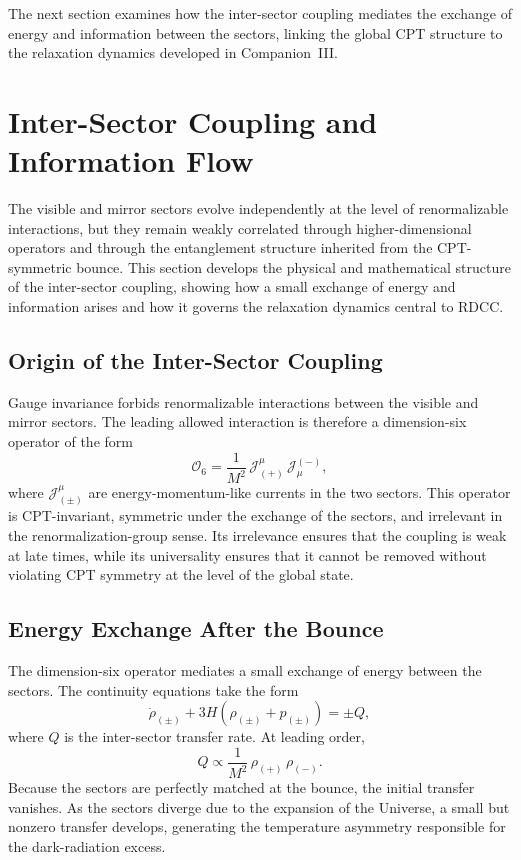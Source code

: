 \documentclass[11pt,a4paper]{article}
\begin{document}
The next section examines how the inter-sector coupling mediates the exchange of energy and information between the sectors, linking the global CPT structure to the relaxation dynamics developed in Companion~III.

\section{Inter-Sector Coupling and Information Flow}

The visible and mirror sectors evolve independently at the level of renormalizable interactions, but they remain weakly correlated through higher-dimensional operators and through the entanglement structure inherited from the CPT-symmetric bounce. This section develops the physical and mathematical structure of the inter-sector coupling, showing how a small exchange of energy and information arises and how it governs the relaxation dynamics central to RDCC.

\subsection{Origin of the Inter-Sector Coupling}

Gauge invariance forbids renormalizable interactions between the visible and mirror sectors. The leading allowed interaction is therefore a dimension-six operator of the form
\begin{equation}
    \mathcal{O}_6 = \frac{1}{M^2}\,\mathcal{J}^{\mu}_{(+)}\,\mathcal{J}_{\mu}^{(-)},
\end{equation}
where $\mathcal{J}^{\mu}_{(\pm)}$ are energy-momentum-like currents in the two sectors. This operator is CPT-invariant, symmetric under the exchange of the sectors, and irrelevant in the renormalization-group sense. Its irrelevance ensures that the coupling is weak at late times, while its universality ensures that it cannot be removed without violating CPT symmetry at the level of the global state.

\subsection{Energy Exchange After the Bounce}

The dimension-six operator mediates a small exchange of energy between the sectors. The continuity equations take the form
\begin{equation}
    \dot{\rho}_{(\pm)} + 3H\left(\rho_{(\pm)} + p_{(\pm)}\right)
    = \pm Q,
\end{equation}
where $Q$ is the inter-sector transfer rate. At leading order,
\begin{equation}
    Q \propto \frac{1}{M^2}\,\rho_{(+)}\,\rho_{(-)}.
\end{equation}
Because the sectors are perfectly matched at the bounce, the initial transfer vanishes. As the sectors diverge due to the expansion of the Universe, a small but nonzero transfer develops, generating the temperature asymmetry responsible for the dark-radiation excess.
\end{document}
